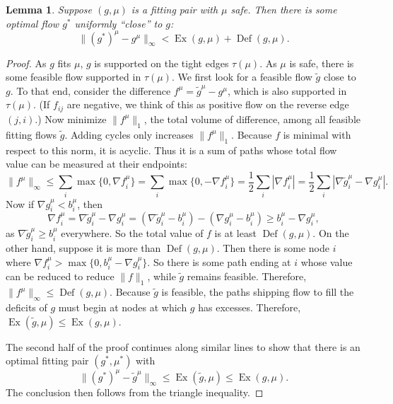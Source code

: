 \documentclass[11pt]{article}
\newtheorem{lemma}[theorem]{Lemma}
\theoremstyle{definition}
\theoremstyle{definition}
\theoremstyle{definition}
\newcommand{\fu}{f^{\mu}}
\newcommand{\nfiu}{\nabla \fu_i}
\newcommand{\biu}{b_{i}^{\mu}}
\DeclareMathOperator{\Ex}{Ex}
\DeclareMathOperator{\Def}{Def}
\begin{document}
    \begin{lemma} \label{lem.bound-dist}
    Suppose $(g, \mu)$ is a fitting pair with $\mu$ safe. Then there is some optimal flow $g^*$
    uniformly ``close'' to $g$:
    \[ \|(g^*)^\mu - g^\mu\|_\infty < \Ex(g, \mu) + \Def(g, \mu). \]
    \end{lemma}
    \begin{proof}
			As $g$ fits $\mu$, $g$ is supported on the tight edges $\tau(\mu)$. As
			$\mu$ is safe, there is some feasible flow supported in $\tau(\mu)$. We first
    look for a feasible flow $\tilde{g}$ close to $g$. To that end, consider the
    difference $f^\mu = \tilde{g}^\mu - g^\mu$, which is also supported in $\tau(\mu)$.
    (If $f_{ij}$ are negative, we think of this as positive flow on the reverse edge $(j, i)$.)
    Now minimize $\|f^\mu\|_1$, the total volume of difference,
    among all feasible fitting flows $\tilde{g}$. Adding cycles only increases $\|f^\mu\|_1$.
    Because $f$ is minimal with respect to this norm, it is acyclic. Thus it is a sum of
    paths whose total flow value can be measured at their endpoints:
    \[ \|f^\mu\|_\infty \leq \sum_i \max\{0, \nfiu\} = \sum_i \max\{0, -\nfiu\} = \frac{1}{2}\sum_i |\nfiu|
     = \frac{1}{2}\sum_i |\nabla \tilde{g}^\mu_i - \nabla g^\mu_i|. \]
    Now if $\nabla g_i^\mu < b_i^\mu$, then
    \[ \nfiu = \nabla \tilde{g}_i^\mu - \nabla g_i^\mu
     = (\nabla \tilde{g}_i^\mu - b_i^\mu) - (\nabla g_i^\mu - b_i^\mu) \geq b_i^\mu - \nabla g_i^\mu, \]
    as $\nabla \tilde{g}_i^\mu \geq b_i^\mu$ everywhere. So the total value of $f$ is at least
    $\Def(g, \mu)$. On the other hand, suppose it is more than $\Def(g, \mu)$. Then there
    is some node $i$ where $\nfiu > \max\{0, \biu - \nabla g_i^\mu\}$. So there is some path
    ending at $i$ whose value can be reduced to reduce $\|f\|_1$, while $\tilde{g}$
    remains feasible. Therefore, $\|f^\mu\|_\infty \leq \Def(g, \mu)$. Because $\tilde{g}$ is feasible,
    the paths shipping flow to fill the deficits of $g$ must begin at nodes at which $g$ has
    excesses. Therefore, $\Ex(\tilde{g}, \mu) \leq \Ex(g, \mu)$.
    
    The second half of the proof continues along similar lines to show that there is an optimal
    fitting pair $(g^*, \mu^*)$ with
    \[ \|(g^*)^\mu - \tilde{g}^\mu\|_\infty \leq \Ex(\tilde{g}, \mu) \leq \Ex(g, \mu). \]
    The conclusion then follows from the triangle inequality.
    
    \end{proof}
    
\end{document}
